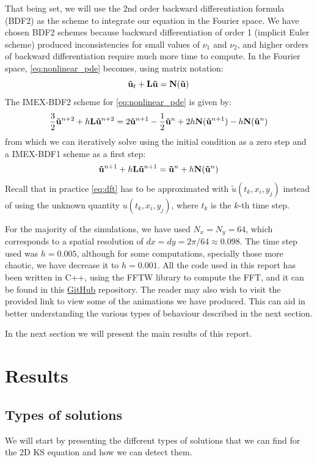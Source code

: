 \documentclass[twoside]{article}
\begin{document}
That being set, we will use the 2nd order backward differentiation formula (BDF2) as the scheme to integrate our equation in the Fourier space. We have chosen BDF2 schemes because backward differentiation of order 1 (implicit Euler scheme) produced inconsistencies for small values of $\nu_1$ and $\nu_2$, and higher orders of backward differentiation require much more time to compute. In the Fourier space, \cref{eq:nonlinear_pde} becomes, using matrix notation:
\begin{equation}
  \boldsymbol{\mathrm{\tilde{u}}}_t+\boldsymbol{\mathrm{L}}\boldsymbol{\mathrm{\tilde{u}}}=\boldsymbol{\mathrm{N}}(\boldsymbol{\mathrm{\tilde{u}}})
\end{equation}
The IMEX-BDF2 scheme for \cref{eq:nonlinear_pde} is given by:
\begin{equation}
  \frac{3}{2} \boldsymbol{\mathrm{\tilde{u}}}^{n+2} +h \boldsymbol{\mathrm{L}} \boldsymbol{\mathrm{\tilde{u}}}^{n+2} = 2 \boldsymbol{\mathrm{\tilde{u}}}^{n+1} - \frac{1}{2} \boldsymbol{\mathrm{\tilde{u}}}^{n} + 2h \boldsymbol{\mathrm{N}}(\boldsymbol{\mathrm{\tilde{u}}}^{n+1}) -  h \boldsymbol{\mathrm{N}}(\boldsymbol{\mathrm{\tilde{u}}}^{n})
\end{equation}
from which we can iteratively solve using the initial condition as a zero step and a IMEX-BDF1 scheme as a first step:
\begin{equation}
  \boldsymbol{\mathrm{\tilde{u}}}^{n+1} + h \boldsymbol{\mathrm{L}} \boldsymbol{\mathrm{\tilde{u}}}^{n+1} = \boldsymbol{\mathrm{\tilde{u}}}^{n} + h \boldsymbol{\mathrm{N}}(\boldsymbol{\mathrm{\tilde{u}}}^{n})
\end{equation}
Recall that in practice \cref{eq:dft} has to be approximated with $\tilde{u}(t_k,x_i,y_j)$ instead of using the unknown quantity $u(t_k,x_i,y_j)$, where $t_k$ is the $k$-th time step.

For the majority of the simulations, we have used $N_x=N_y=64$, which corresponds to a spatial resolution of $dx=dy=2\pi/64\approx 0.098$. The time step used was $h=0.005$, although for some computations, specially those more chaotic, we have decrease it to $h=0.001$. All the code used in this report has been written in C++, using the FFTW library \cite{fftw} to compute the FFT, and it can be found in this \href{https://github.com/victorballester7/2d-kuramoto-sivashinsky}{GitHub} repository. The reader may also wish to visit the provided link to view some of the animations we have produced. This can aid in better understanding the various types of behaviour described in the next section.

In the next section we will present the main results of this report.
\section{Results}
\subsection{Types of solutions}\label{sec:types_of_solutions}
We will start by presenting the different types of solutions that we can find for the 2D KS equation and how we can detect them.
\end{document}
